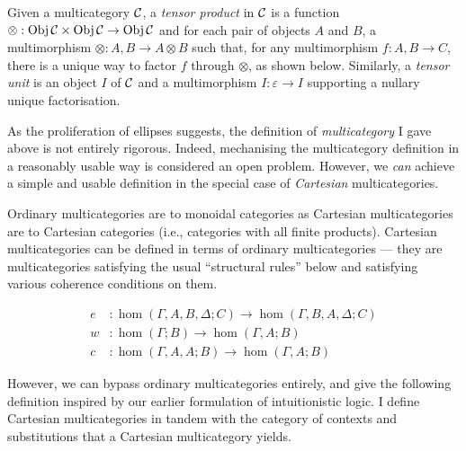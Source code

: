 \begin{definition}
  Given a multicategory $\mathcal C$, a \emph{tensor product} in $\mathcal C$ is a function
  ${\otimes} : \operatorname{Obj}\mathcal C \times \operatorname{Obj}\mathcal C \to \operatorname{Obj}\mathcal C$ and for each pair of objects
  $A$ and $B$, a multimorphism ${\otimes} : A, B \to A \otimes B$ such that,
  for any multimorphism $f : A, B \to C$, there is a unique way to factor $f$
  through $\otimes$, as shown below.
  Similarly, a \emph{tensor unit} is an object $I$ of $\mathcal C$ and a multimorphism
  $I : \varepsilon \to I$ supporting a nullary unique factorisation.

\end{definition}

As the proliferation of ellipses suggests, the definition of
\emph{multicategory} I gave above is not entirely rigorous.
Indeed, mechanising the multicategory definition in a reasonably usable way is
considered an open problem. 
However, we \emph{can} achieve a simple and usable definition in the special
case of \emph{Cartesian} multicategories.

Ordinary multicategories are to monoidal categories as Cartesian multicategories
are to Cartesian categories (i.e., categories with all finite products).
Cartesian multicategories can be defined in terms of ordinary multicategories
--- they are multicategories satisfying the usual ``structural rules'' below
and satisfying various coherence conditions on them.

\begin{align*}
  e &: \hom(\Gamma, A, B, \Delta; C) \to \hom(\Gamma, B, A, \Delta; C) \\
  w &: \hom(\Gamma; B) \to \hom(\Gamma, A; B) \\
  c &: \hom(\Gamma, A, A; B) \to \hom(\Gamma, A; B)
\end{align*}

However, we can bypass ordinary multicategories entirely, and give the following
definition inspired by our earlier formulation of intuitionistic logic.
I define Cartesian multicategories in tandem with the category of contexts and
substitutions that a Cartesian multicategory yields.

